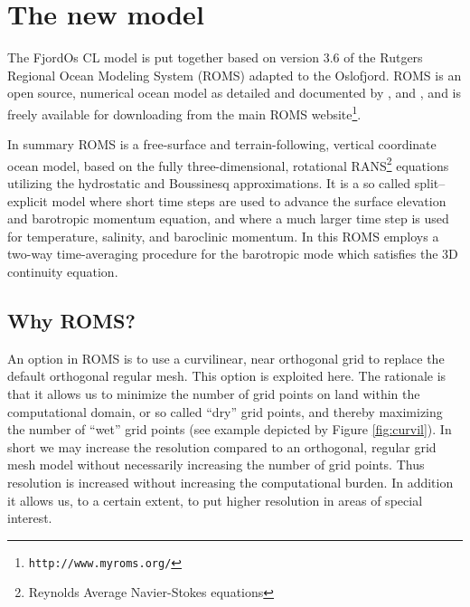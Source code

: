 \section{The new model}
\label{sec:model}
The FjordOs CL model is put together based on version 3.6 of the Rutgers Regional Ocean Modeling System (ROMS) adapted to the Oslofjord. ROMS is an open source, numerical ocean model as detailed and documented by \cite{haidv:etal:2008}, \cite{shche:mcwil:2003} and \cite{shche:mcwil:2005, shche:mcwil:2009}, and is freely available for downloading from the main ROMS website\footnote{\texttt{http://www.myroms.org/}}. 

In summary ROMS is a free-surface and terrain-following, vertical coordinate ocean model, based on the fully three-dimensional, rotational RANS\footnote{Reynolds Average Navier-Stokes equations} equations utilizing the hydrostatic and Boussinesq approximations. It is a so called split–explicit model where short time steps are used to advance the surface elevation and barotropic momentum equation, and where a much larger time step is used for temperature, salinity, and baroclinic momentum. In this ROMS employs a two-way time-averaging procedure for the barotropic mode which satisfies the 3D continuity equation. 

\subsection{Why ROMS?}
An option in ROMS is to use a curvilinear, near orthogonal grid to replace the default orthogonal regular mesh. This option is exploited here. The rationale is that it allows us to minimize the number of grid points on land within the computational domain, or so called ``dry'' grid points, and thereby maximizing the number of ``wet'' grid points (see example depicted by Figure \ref{fig:curvil}). In short we may increase the resolution compared to an orthogonal, regular grid mesh model without necessarily increasing the number of grid points. Thus resolution is increased without increasing the computational burden. In addition it allows us, to a certain extent, to put higher resolution in areas of special interest.


